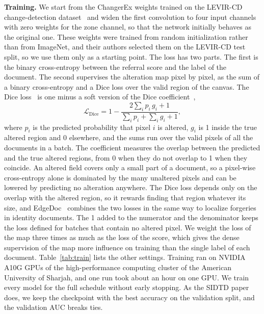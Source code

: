 \documentclass[12pt,a4paper]{article}
\begin{document}
\textbf{Training.} We start from the ChangerEx weights trained on the LEVIR-CD change-detection dataset~\cite{chen2020levir} and widen the first convolution to four input channels with zero weights for the zone channel, so that the network initially behaves as the original one. These weights were trained from random initialization rather than from ImageNet, and their authors selected them on the LEVIR-CD test split, so we use them only as a starting point. The loss has two parts. The first is the binary cross-entropy between the referral score and the label of the document. The second supervises the alteration map pixel by pixel, as the sum of a binary cross-entropy and a Dice loss over the valid region of the canvas. The Dice loss~\cite{milletari2016vnet} is one minus a soft version of the Dice coefficient~\cite{dice1945},
\begin{equation}
\mathcal{L}_{\text{Dice}} = 1 - \frac{2\sum_i p_i\, g_i + 1}{\sum_i p_i + \sum_i g_i + 1},
\label{eq:dice}
\end{equation}
where $p_i$ is the predicted probability that pixel $i$ is altered, $g_i$ is 1 inside the true altered region and 0 elsewhere, and the sums run over the valid pixels of all the documents in a batch. The coefficient measures the overlap between the predicted and the true altered regions, from 0 when they do not overlap to 1 when they coincide. An altered field covers only a small part of a document, so a pixel-wise cross-entropy alone is dominated by the many unaltered pixels and can be lowered by predicting no alteration anywhere. The Dice loss depends only on the overlap with the altered region, so it rewards finding that region whatever its size, and EdgeDoc~\cite{george2025edgedoc} combines the two losses in the same way to localize forgeries in identity documents. The 1 added to the numerator and the denominator keeps the loss defined for batches that contain no altered pixel. We weight the loss of the map three times as much as the loss of the score, which gives the dense supervision of the map more influence on training than the single label of each document. Table~\ref{tab:train} lists the other settings. Training ran on NVIDIA A10G GPUs of the high-performance computing cluster of the American University of Sharjah, and one run took about an hour on one GPU. We train every model for the full schedule without early stopping. As the SIDTD paper does, we keep the checkpoint with the best accuracy on the validation split, and the validation AUC breaks ties.
\end{document}
